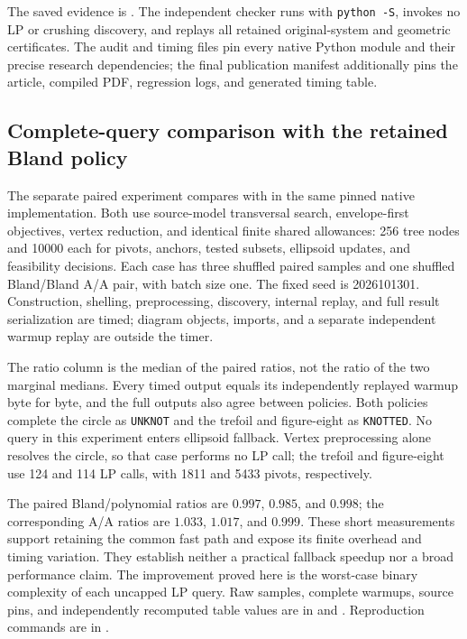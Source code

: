The saved evidence is .  The independent
checker runs with \texttt{python -S}, invokes no LP or crushing discovery,
and replays all retained original-system and geometric certificates.  The
audit and timing files pin every native Python module and their precise
research dependencies; the final publication manifest additionally pins
the article, compiled PDF, regression logs, and generated timing table.

\subsection{Complete-query comparison with the retained Bland policy}

The separate paired experiment compares  with
 in the same pinned native implementation.  Both
use source-model transversal search, envelope-first objectives, vertex
reduction, and identical finite shared allowances: 256 tree nodes and
10000 each for pivots, anchors, tested subsets, ellipsoid updates, and
feasibility decisions.  Each case has three shuffled paired samples and
one shuffled Bland/Bland A/A pair, with batch size one.  The fixed seed is
2026101301.  Construction, shelling, preprocessing, discovery, internal
replay, and full result serialization are timed; diagram objects, imports,
and a separate independent warmup replay are outside the timer.

\begin{center}

\end{center}
The ratio column is the median of the paired ratios, not the ratio of
the two marginal medians.  Every timed output equals its independently
replayed warmup byte for byte, and the full outputs also agree between
policies.  Both policies complete the circle as \texttt{UNKNOT} and the
trefoil and figure-eight as \texttt{KNOTTED}.  No query in this experiment
enters ellipsoid fallback.  Vertex preprocessing alone resolves the circle,
so that case performs no LP call; the trefoil and figure-eight use 124 and
114 LP calls, with 1811 and 5433 pivots, respectively.

The paired Bland/polynomial ratios are $0.997$, $0.985$, and $0.998$;
the corresponding A/A ratios are $1.033$, $1.017$, and $0.999$.
These short measurements support retaining the common fast path and expose
its finite overhead and timing variation.  They establish neither a
practical fallback speedup nor a broad performance claim.  The improvement
proved here is the worst-case binary complexity of each uncapped LP query.
Raw samples, complete warmups, source pins, and independently recomputed
table values are in  and
.  Reproduction commands are in
.
